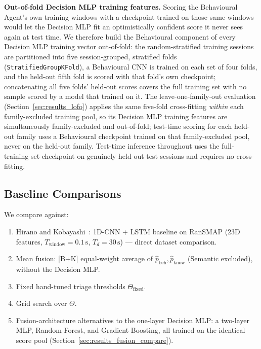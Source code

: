 \documentclass[journal]{IEEEtran}
\begin{document}
\textbf{Out-of-fold Decision MLP training features.} Scoring the
Behavioural Agent's own training windows with a checkpoint trained on those
same windows would let the Decision MLP fit an optimistically confident
score it never sees again at test time. We therefore build the Behavioural
component of every Decision MLP training vector out-of-fold: the
random-stratified training sessions are partitioned into five
session-grouped, stratified folds (\texttt{StratifiedGroupKFold}), a
Behavioural CNN is trained on each set of four folds, and the held-out
fifth fold is scored with that fold's own checkpoint; concatenating all
five folds' held-out scores covers the full training set with no sample
scored by a model that trained on it. The leave-one-family-out evaluation
(Section~\ref{sec:results_lofo}) applies the same five-fold cross-fitting
\emph{within} each family-excluded training pool, so its Decision MLP
training features are simultaneously family-excluded and out-of-fold; test-time
scoring for each held-out family uses a Behavioural checkpoint trained on
that family-excluded pool, never on the held-out family. Test-time
inference throughout uses the full-training-set checkpoint on genuinely
held-out test sessions and requires no cross-fitting.

\subsection{Baseline Comparisons}

We compare against:
\begin{enumerate}
  \item Hirano and Kobayashi~\cite{hirano2025ransmap}: 1D-CNN + LSTM baseline on
        RanSMAP (23D features, $T_{\text{window}}=0.1\,\text{s}$,
        $T_d=30\,\text{s}$) — direct dataset comparison.
  \item Mean fusion: [B+K] equal-weight average of
        $\hat{p}_{\text{beh}}, \hat{p}_{\text{know}}$ (Semantic excluded),
        without the Decision MLP.
  \item Fixed hand-tuned triage thresholds $\Theta_{\text{fixed}}$.
  \item Grid search over $\Theta$.
  \item Fusion-architecture alternatives to the one-layer Decision MLP:
        a two-layer MLP, Random Forest, and Gradient Boosting, all trained
        on the identical score pool (Section~\ref{sec:results_fusion_compare}).
\end{enumerate}
\end{document}
